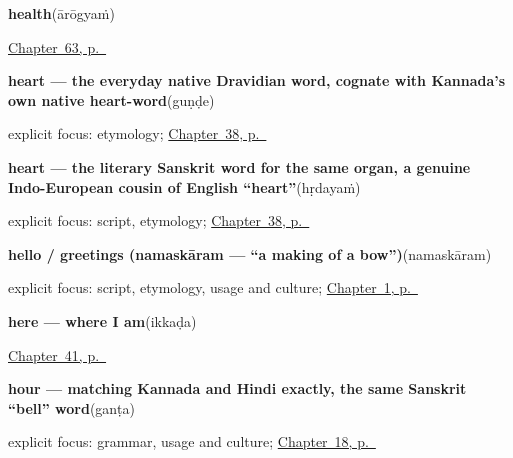 \noindent\begin{minipage}[t]{\linewidth}
\raggedright
\textbf{health}\enspace\emph{}\enspace(ārōgyaṁ)\par
\footnotesize \hyperref[ch:te-health]{Chapter~63, p.~\pageref*{ch:te-health}}
\end{minipage}\par\smallskip

\noindent\begin{minipage}[t]{\linewidth}
\raggedright
\textbf{heart — the everyday native Dravidian word, cognate with Kannada's own native heart-word}\enspace\emph{}\enspace(guṇḍe)\par
\footnotesize explicit focus: etymology; \hyperref[ch:te-heart]{Chapter~38, p.~\pageref*{ch:te-heart}}
\end{minipage}\par\smallskip

\noindent\begin{minipage}[t]{\linewidth}
\raggedright
\textbf{heart — the literary Sanskrit word for the same organ, a genuine Indo-European cousin of English \textquotedblleft{}heart\textquotedblright{}}\enspace\emph{}\enspace(hṛdayaṁ)\par
\footnotesize explicit focus: script, etymology; \hyperref[ch:te-heart]{Chapter~38, p.~\pageref*{ch:te-heart}}
\end{minipage}\par\smallskip

\noindent\begin{minipage}[t]{\linewidth}
\raggedright
\textbf{hello / greetings (namaskāram — \textquotedblleft{}a making of a bow\textquotedblright{})}\enspace\emph{}\enspace(namaskāram)\par
\footnotesize explicit focus: script, etymology, usage and culture; \hyperref[ch:greetings]{Chapter~1, p.~\pageref*{ch:greetings}}
\end{minipage}\par\smallskip

\noindent\begin{minipage}[t]{\linewidth}
\raggedright
\textbf{here — where I am}\enspace\emph{}\enspace(ikkaḍa)\par
\footnotesize \hyperref[ch:te-pointing-and-asking]{Chapter~41, p.~\pageref*{ch:te-pointing-and-asking}}
\end{minipage}\par\smallskip

\noindent\begin{minipage}[t]{\linewidth}
\raggedright
\textbf{hour — matching Kannada and Hindi exactly, the same Sanskrit \textquotedblleft{}bell\textquotedblright{} word}\enspace\emph{}\enspace(ganṭa)\par
\footnotesize explicit focus: grammar, usage and culture; \hyperref[ch:te-telling-time]{Chapter~18, p.~\pageref*{ch:te-telling-time}}
\end{minipage}\par\smallskip

